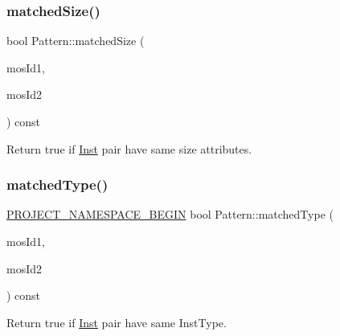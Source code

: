 \mbox{\label{classPattern_ae25db8902e007a9ab055e64f3347d65d}} 
\subsubsection{\texorpdfstring{matched\+Size()}{matchedSize()}}
{\footnotesize\ttfamily bool Pattern\+::matched\+Size (\begin{DoxyParamCaption}\item[{\hyperlink{type_8h_a581e8093e28e7362f2b6937296190676}{Index\+Type}}]{mos\+Id1,  }\item[{\hyperlink{type_8h_a581e8093e28e7362f2b6937296190676}{Index\+Type}}]{mos\+Id2 }\end{DoxyParamCaption}) const\hspace{0.3cm}{\ttfamily [private]}}



Return true if \hyperlink{classInst}{Inst} pair have same size attributes. 

\mbox{\label{classPattern_ab7112a78b0ed0c7638f1af9efdf80955}} 
\subsubsection{\texorpdfstring{matched\+Type()}{matchedType()}}
{\footnotesize\ttfamily \hyperlink{namespace_8h_ae48726a24dab2034454cf6d79e531eb8}{P\+R\+O\+J\+E\+C\+T\+\_\+\+N\+A\+M\+E\+S\+P\+A\+C\+E\+\_\+\+B\+E\+G\+IN} bool Pattern\+::matched\+Type (\begin{DoxyParamCaption}\item[{\hyperlink{type_8h_a581e8093e28e7362f2b6937296190676}{Index\+Type}}]{mos\+Id1,  }\item[{\hyperlink{type_8h_a581e8093e28e7362f2b6937296190676}{Index\+Type}}]{mos\+Id2 }\end{DoxyParamCaption}) const\hspace{0.3cm}{\ttfamily [private]}}



Return true if \hyperlink{classInst}{Inst} pair have same Inst\+Type. 

\mbox{\label{classPattern_a1214e024706aff22e44bb4f4266d8e97}} 

